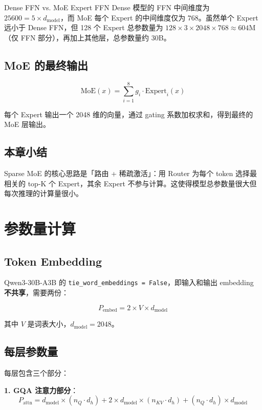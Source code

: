\documentclass[a4paper]{article}
\begin{document}
\begin{knowledgebox}{Dense FFN vs. MoE Expert FFN}
Dense 模型的 FFN 中间维度为 $25600 = 5 \times d_{\text{model}}$，而 MoE 每个 Expert 的中间维度仅为 $768$。虽然单个 Expert 远小于 Dense FFN，但 128 个 Expert 总参数量为 $128 \times 3 \times 2048 \times 768 \approx 604\text{M}$（仅 FFN 部分），再加上其他层，总参数量约 30B。
\end{knowledgebox}

\subsection{MoE 的最终输出}

$$
\text{MoE}(x) = \sum_{i=1}^{8} g_i \cdot \text{Expert}_i(x)
$$

每个 Expert 输出一个 2048 维的向量，通过 gating 系数加权求和，得到最终的 MoE 层输出。

\subsection{本章小结}

Sparse MoE 的核心思路是「路由 + 稀疏激活」：用 Router 为每个 token 选择最相关的 top-K 个 Expert，其余 Expert 不参与计算。这使得模型总参数量很大但每次推理的计算量很小。

\section{参数量计算}

\subsection{Token Embedding}

Qwen3-30B-A3B 的 \texttt{tie\_word\_embeddings = False}，即输入和输出 embedding \textbf{不共享}，需要两份：

$$
P_{\text{embed}} = 2 \times V \times d_{\text{model}}
$$

其中 $V$ 是词表大小，$d_{\text{model}} = 2048$。

\subsection{每层参数量}

每层包含三个部分：

\textbf{1. GQA 注意力部分}：
$$
P_{\text{attn}} = d_{\text{model}} \times (n_Q \cdot d_h) + 2 \times d_{\text{model}} \times (n_{KV} \cdot d_h) + (n_Q \cdot d_h) \times d_{\text{model}}
$$
\end{document}
